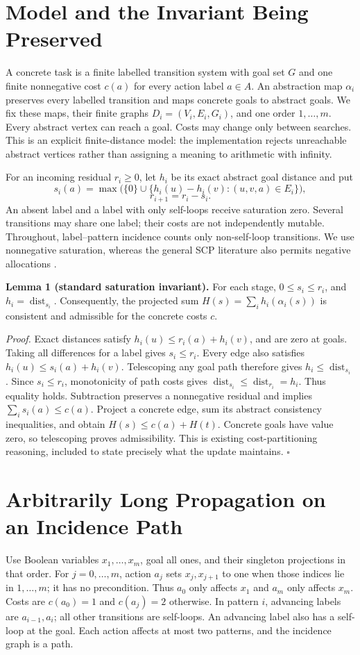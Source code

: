 \section{Model and the Invariant Being Preserved}
A concrete task is a finite labelled transition system with goal set $G$ and one finite nonnegative cost $c(a)$ for every action label $a\in A$. An abstraction map $\alpha_i$ preserves every labelled transition and maps concrete goals to abstract goals. We fix these maps, their finite graphs $D_i=(V_i,E_i,G_i)$, and one order $1,\ldots,m$. Every abstract vertex can reach a goal. Costs may change only between searches. This is an explicit finite-distance model: the implementation rejects unreachable abstract vertices rather than assigning a meaning to arithmetic with infinity.

For an incoming residual $r_i\geq0$, let $h_i$ be its exact abstract goal distance and put
\[
 s_i(a)=\max\bigl(\{0\}\cup\{h_i(u)-h_i(v):(u,v,a)\in E_i\}\bigr),
 \]
\[ r_{i+1}=r_i-s_i.
\]
An absent label and a label with only self-loops receive saturation zero. Several transitions may share one label; their costs are not independently mutable. Throughout, label--pattern incidence counts only non-self-loop transitions. We use nonnegative saturation, whereas the general SCP literature also permits negative allocations \citep{scp2020}.

\textbf{Lemma 1 (standard saturation invariant).} For each stage, $0\leq s_i\leq r_i$, and $h_i=\operatorname{dist}_{s_i}$. Consequently, the projected sum $H(s)=\sum_i h_i(\alpha_i(s))$ is consistent and admissible for the concrete costs $c$.

\textit{Proof.} Exact distances satisfy $h_i(u)\leq r_i(a)+h_i(v)$, and are zero at goals. Taking all differences for a label gives $s_i\leq r_i$. Every edge also satisfies $h_i(u)\leq s_i(a)+h_i(v)$. Telescoping any goal path therefore gives $h_i\leq\operatorname{dist}_{s_i}$. Since $s_i\leq r_i$, monotonicity of path costs gives $\operatorname{dist}_{s_i}\leq\operatorname{dist}_{r_i}=h_i$. Thus equality holds. Subtraction preserves a nonnegative residual and implies $\sum_i s_i(a)\leq c(a)$. Project a concrete edge, sum its abstract consistency inequalities, and obtain $H(s)\leq c(a)+H(t)$. Concrete goals have value zero, so telescoping proves admissibility. This is existing cost-partitioning reasoning, included to state precisely what the update maintains. $\square$

\section{Arbitrarily Long Propagation on an Incidence Path}
Use Boolean variables $x_1,\ldots,x_m$, goal all ones, and their singleton projections in that order. For $j=0,\ldots,m$, action $a_j$ sets $x_j,x_{j+1}$ to one when those indices lie in $1,\ldots,m$; it has no precondition. Thus $a_0$ only affects $x_1$ and $a_m$ only affects $x_m$. Costs are $c(a_0)=1$ and $c(a_j)=2$ otherwise. In pattern $i$, advancing labels are $a_{i-1},a_i$; all other transitions are self-loops. An advancing label also has a self-loop at the goal. Each action affects at most two patterns, and the incidence graph is a path.

